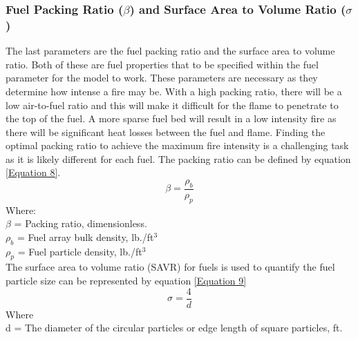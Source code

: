 \documentclass{article}
\begin{document}
 \subsubsection{Fuel Packing Ratio ($\beta$) and Surface Area to Volume Ratio ($\sigma$)}
 \indent The last parameters are the fuel packing ratio and the surface area to volume ratio. Both of these are fuel properties that to be specified within the fuel parameter for the model to work. These parameters are necessary as they determine how intense a fire may be. With a high packing ratio, there will be a low air-to-fuel ratio and this will make it difficult for the flame to penetrate to the top of the fuel. A more sparse fuel bed will result in a low intensity fire as there will be significant heat losses between the fuel and flame. Finding the optimal packing ratio to achieve the maximum fire intensity is a challenging task as it is likely different for each fuel. The packing ratio can be defined by equation \ref{Equation 8}.
 \begin{equation}
 	\beta = \frac {\rho _ b } {\rho _ p} 
 	\label{Equation 8}
 \end{equation}
Where: \\
$\beta$ = Packing ratio, dimensionless. \\
$\rho _ b$ = Fuel array bulk density, lb./ft$^3$ \\
$\rho _ p$ = Fuel particle density, lb./ft$^3$ \\

\indent The surface area to volume ratio (SAVR) for fuels is used to quantify the fuel particle size can be represented by equation \ref{Equation 9}
\begin{equation}
	\label{Equation 9}
	\sigma = \frac {4} {d} 
\end{equation}
 Where\\
 d = The diameter of the circular particles or edge length of square particles, ft.
\end{document}
